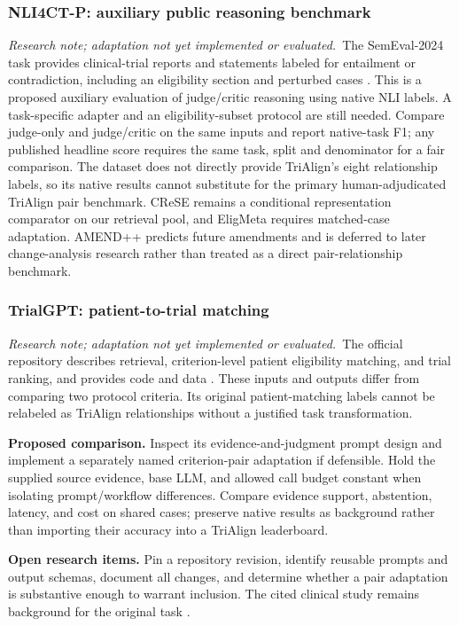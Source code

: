\documentclass[10pt,letterpaper]{article}
\newcommand{\research}{\textit{Research note; adaptation not yet implemented or evaluated.}}
\begin{document}
\subsubsection{NLI4CT-P: auxiliary public reasoning benchmark}
\research\ The SemEval-2024 task provides clinical-trial reports and statements
labeled for entailment or contradiction, including an eligibility section
and perturbed cases \cite{nli4ct2024}. This is a proposed auxiliary evaluation
of judge/critic reasoning using native NLI labels. A task-specific adapter
and an eligibility-subset protocol are still needed. Compare judge-only and
judge/critic on the same inputs and report native-task F1; any published
headline score requires the same task, split and denominator for a fair
comparison. The dataset does not directly provide TriAlign's eight relationship
labels, so its native results cannot substitute for the primary human-adjudicated
TriAlign pair benchmark. CReSE remains a conditional representation comparator
on our retrieval pool, and EligMeta requires matched-case adaptation.
AMEND++ predicts future amendments and is deferred to later change-analysis
research rather than treated as a direct pair-relationship benchmark.

\subsubsection{TrialGPT: patient-to-trial matching}
\research\ The official repository describes retrieval, criterion-level
patient eligibility matching, and trial ranking, and provides code and data
\cite{trialgptcode}. These inputs and outputs differ from comparing two
protocol criteria. Its original patient-matching labels cannot be relabeled
as TriAlign relationships without a justified task transformation.

\textbf{Proposed comparison.} Inspect its evidence-and-judgment prompt design
and implement a separately named criterion-pair adaptation if defensible.
Hold the supplied source evidence, base LLM, and allowed call budget constant
when isolating prompt/workflow differences. Compare evidence support,
abstention, latency, and cost on shared cases; preserve native results as
background rather than importing their accuracy into a TriAlign leaderboard.

\textbf{Open research items.} Pin a repository revision, identify reusable
prompts and output schemas, document all changes, and determine whether a
pair adaptation is substantive enough to warrant inclusion. The cited
clinical study remains background for the original task \cite{trialgpt}.
\end{document}
